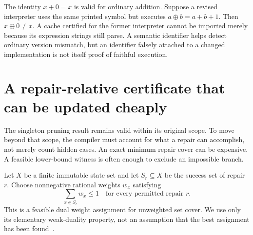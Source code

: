 \begin{SIIcounterexample}\label{SII:ex:semantic-cache}
The identity $x+0=x$ is valid for ordinary addition. Suppose a revised interpreter uses the same printed symbol but executes $a\mathbin{\oplus}b=a+b+1$. Then $x\mathbin{\oplus}0\ne x$. A cache certified for the former interpreter cannot be imported merely because its expression strings still parse. A semantic identifier helps detect ordinary version mismatch, but an identifier falsely attached to a changed implementation is not itself proof of faithful execution.
\end{SIIcounterexample}

\section{A repair-relative certificate that can be updated cheaply}\label{SII:sec:weighted-pruning}
The singleton pruning result remains valid within its original scope. To move beyond that scope, the compiler must account for what a repair can accomplish, not merely count hidden cases. An exact minimum repair cover can be expensive. A feasible lower-bound witness is often enough to exclude an impossible branch.

Let $X$ be a finite immutable state set and let $S_r\subseteq X$ be the success set of repair $r$. Choose nonnegative rational weights $w_x$ satisfying
\begin{equation}\label{SII:eq:repair-weights}
 \sum_{x\in S_r}w_x\le1\quad\text{for every permitted repair }r.
\end{equation}
This is a feasible dual weight assignment for unweighted set cover. We use only its elementary weak-duality property, not an assumption that the best assignment has been found~\cite{SII:williamson}.


